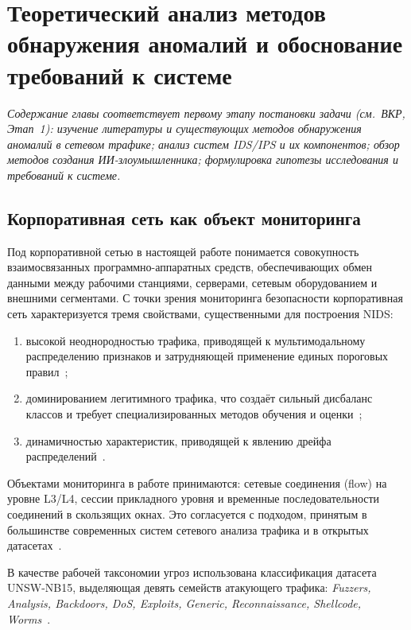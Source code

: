 \section{Теоретический анализ методов обнаружения аномалий и обоснование требований к системе}
\label{ch:theory}

\noindent
\textit{Содержание главы соответствует первому этапу постановки
задачи (см.~ВКР, Этап~1): изучение литературы и существующих методов
обнаружения аномалий в сетевом трафике; анализ систем IDS/IPS и их
компонентов; обзор методов создания ИИ-злоумышленника; формулировка
гипотезы исследования и требований к системе.}\\

\subsection{Корпоративная сеть как объект мониторинга}

Под корпоративной сетью в настоящей работе понимается совокупность
взаимосвязанных программно-аппаратных средств, обеспечивающих обмен
данными между рабочими станциями, серверами, сетевым оборудованием и
внешними сегментами. С точки зрения мониторинга безопасности
корпоративная сеть характеризуется тремя свойствами, существенными
для построения NIDS:

\begin{enumerate}
    \item высокой неоднородностью трафика, приводящей к мультимодальному
    распределению признаков и затрудняющей применение единых пороговых
    правил~\cite{khraisat2019survey, ahmad2021nids};
    \item доминированием легитимного трафика, что создаёт сильный
    дисбаланс классов и требует специализированных методов обучения
    и оценки~\cite{sommer2010outside, chawla2002smote, lin2017focal};
    \item динамичностью характеристик, приводящей к явлению дрейфа
    распределений~\cite{gama2014drift, andresini2021insomnia}.
\end{enumerate}

Объектами мониторинга в работе принимаются: сетевые соединения
(flow) на уровне L3/L4, сессии прикладного уровня и временные
последовательности соединений в скользящих окнах. Это согласуется
с подходом, принятым в большинстве современных систем сетевого
анализа трафика и в открытых
датасетах~\cite{moustafa2015unsw, sharafaldin2018toward}.

В качестве рабочей таксономии угроз использована классификация
датасета UNSW-NB15, выделяющая девять семейств атакующего трафика:
\emph{Fuzzers, Analysis, Backdoors, DoS, Exploits, Generic,
Reconnaissance, Shellcode, Worms}~\cite{moustafa2015unsw}.

